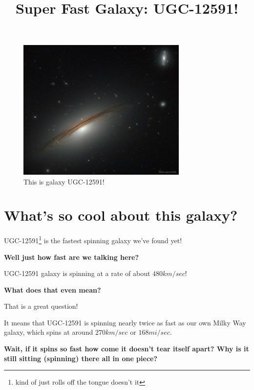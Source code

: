 \documentclass[10pt,letterpaper]{article}
\title{Super Fast Galaxy: UGC-12591!}
\begin{document}

\begin{figure}[!ht]
\begin{framed}
\begin{center}
\includegraphics[width=0.75\textwidth]{../Images/UGC125991.jpg} 
\caption{This is galaxy UGC-12591!}
\end{center}
\end{framed}
\end{figure}




\section*{What's so cool about this galaxy?}

UGC-12591\footnote{kind of just rolls off the tongue doesn't it} is the fastest spinning galaxy we've found yet!

\textbf{Well just how fast are we talking here?}

UGC-12591 galaxy is spinning at a rate of about $480 km/sec$!

\textbf{What does that even mean?}

That is a great question! 

It means that UGC-12591 is spinning nearly twice as fast as our own Milky Way galaxy, which spins at around $270 km/sec$ or $168 mi/sec$. 

\textbf{Wait, if it spins so fast how come it doesn't tear itself apart? Why is it still sitting (spinning) there all in one piece?}
\end{document}
